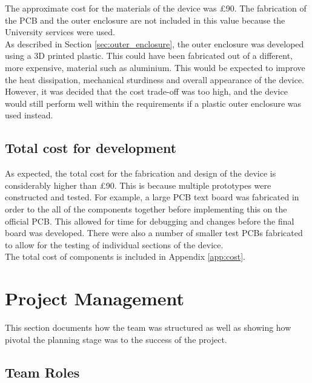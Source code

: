 \documentclass[a4paper,12pt]{article}
\begin{document}
The approximate cost for the materials of the device was \pounds90. The fabrication of the PCB and the outer enclosure are not included in this value because the University services were used. \\

As described in Section \ref{sec:outer_enclosure}, the outer enclosure was developed using a 3D printed plastic. This could have been fabricated out of a different, more expensive, material such as aluminium. This would be expected to improve the heat dissipation, mechanical sturdiness and overall appearance of the device. However, it was decided that the cost trade-off was too high, and the device would still perform well within the requirements if a plastic outer enclosure was used instead.

\subsection{Total cost for development}
\label{sec:total_cost}

As expected, the total cost for the fabrication and design of the device is considerably higher than \pounds90. This is because multiple prototypes were constructed and tested. For example, a large PCB text board was fabricated in order to the all of the components together before implementing this on the official PCB. This allowed for time for debugging and changes before the final board was developed. There were also a number of smaller test PCBs fabricated to allow for the testing of individual sections of the device. \\

The total cost of components is included in Appendix \ref{app:cost}.


\newpage
\section{Project Management}
\label{sec:project_management}

This section documents how the team was structured as well as showing how pivotal the planning stage was to the success of the project.

\subsection{Team Roles}
\label{sec:team_roles}
\end{document}
